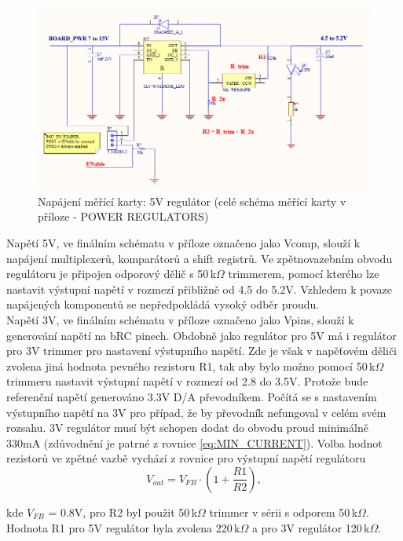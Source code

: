 \begin{figure}[ht!]
    \centering
    \includegraphics[width = 1\textwidth]{obrazky/PSU.png}
    \caption{Napájení měřící karty: 5V regulátor (celé schéma měřící karty v příloze -  POWER REGULATORS)}
    \label{Napájení měřící karty: 5V regulátor}
\end{figure}

Napětí 5V, ve finálním schématu v příloze označeno jako Vcomp,
slouží k napájení multiplexerů, komparátorů a shift registrů. Ve zpětnovazebním obvodu regulátoru
je připojen odporový dělič s 50\,k$\Omega$ trimmerem, pomocí kterého lze nastavit výstupní napětí v rozmezí
přibližně od 4.5 do 5.2V. Vzhledem k povaze napájených komponentů se nepředpokládá vysoký odběr proudu.\\

Napětí 3V, ve finálním schématu v příloze označeno jako Vpins, slouží k generování napětí na bRC pinech. Obdobně jako regulátor pro 5V má i regulátor pro 3V trimmer pro
nastavení výstupního napětí. Zde je však v napěťovém děliči zvolena jiná hodnota pevného rezistoru R1, tak aby
bylo možno pomocí 50\,k$\Omega$ trimmeru nastavit výstupní napětí v rozmezí od 2.8 do 3.5V.
Protože bude referenční napětí generováno 3.3V D/A převodníkem. Počítá se s nastavením výstupního napětí na 3V pro 
případ, že by převodník nefungoval v celém svém rozsahu. 3V regulátor musí být schopen dodat do obvodu proud minimálně
330mA (zdůvodnění je patrné z rovnice \ref{eq:MIN_CURRENT}).
Volba hodnot rezistorů ve zpětné vazbě vychází z rovnice pro výstupní napětí regulátoru
\begin{equation}
    V_{out} = V_{FB}  \cdot (1 + \frac{R1}{R2}),
\end{equation}

\noindent kde $V_{FB}$ = 0.8V, pro R2 byl použit 50\,k$\Omega$ trimmer v sérii s odporem 50\,k$\Omega$.
Hodnota R1 pro 5V regulátor byla zvolena
220\,k$\Omega$ a pro 3V regulátor 120\,k$\Omega$.\\

